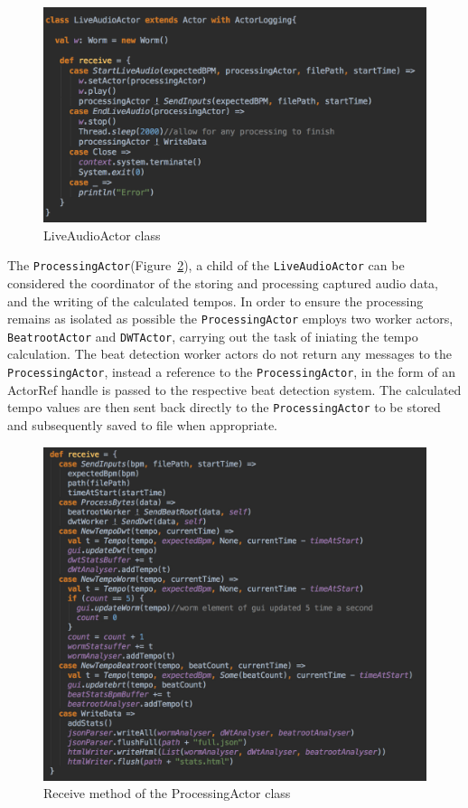 \documentclass[a4paper, 11pt]{article}
\begin{document}
\begin{figure}[h]
\centering
\includegraphics[scale=0.3]{images/LiveAudioActor.jpg}
\caption{LiveAudioActor class}
\label{fig: liveaudioactor}
\end{figure}

The \texttt{ProcessingActor}(Figure~\ref{fig: processingActor}), a child of the \texttt{LiveAudioActor} can be considered the coordinator of the storing and processing captured audio data, and the writing of the calculated tempos. In order to ensure the processing remains as isolated as possible the \texttt{ProcessingActor} employs two worker actors, \texttt{BeatrootActor} and \texttt{DWTActor}, carrying out the task of iniating the tempo calculation. The beat detection worker actors do not return any messages to the \texttt{ProcessingActor}, instead a reference to the \texttt{ProcessingActor}, in the form of an ActorRef handle is passed to the respective beat detection system. The calculated tempo values are then sent back directly to the \texttt{ProcessingActor} to be stored and subsequently saved to file when appropriate.\par

\begin{figure}[h]
\centering
\includegraphics[scale=0.3]{images/processingRec.jpg}
\caption{Receive method of the ProcessingActor class}
\label{fig: processingActor}
\end{figure}
\end{document}
